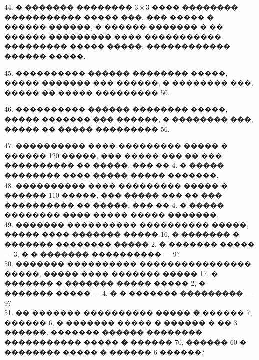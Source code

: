 \documentclass[12pt]{article}
\begin{document}
\begin{center}
\begin{figure}[ht!]
\end{figure}
\end{center}
44. � ������� �������� $3\times3$ ���� �������� ����������� ����� ���, ��� ����� � ������ ������, � ������ ������� � �� ������ ��������� ���� �����������. ��������� ����� �����. ������������ ������ �����.
\begin{center}
\begin{figure}[ht!]
\end{figure}
\end{center}
45. ���������� ������ �������� �����, ����� ������� ��� ������, � �������� ���, ����� �� ����� ��������� 50.
\begin{center}
\begin{figure}[ht!]
\end{figure}
\end{center}
46. ���������� ������ �������� �����, ����� ������� ��� ������, � �������� ���, ����� �� ����� ��������� 56.
\begin{center}
\begin{figure}[ht!]
\end{figure}
\end{center}
47. ���������� ���� ��������� ����� � ������ 120 �����, ��� ����� ��� �� ��� ���������� �� �����, ��� �� 4. � ����� �������� ���� ����� ����� �������.\\
48. ���������� ���� ��������� ����� � ������ 110 �����, ��� ����� ��� �� ��� ���������� �� �����, ��� �� 4. � ����� �������� ���� ����� ����� �������.\\
49. ������� ���������� ���������� �����, ����� ���� ������� ����� 16, � ������� � ������� �������� ����� 2, � ������� ����� --- 3, � � ������� ���������� --- 9?\\
50. ������� ���������� ���������������� �����, ����� ���� ������� ����� 17, � ������� � ������� ����� ����� 2, � ������� ����� --- 4, � � ������� ��������� --- 9?\\
51. �� ������� ���������� ����� {\bf �} ������ 7, ������ 6, � ������� ����� � ������ � �� 3 ������. ������� ������ �������� ����������� ����� {\bf �} ������ 70, ������ 60 � �������� ����� � ������ 6 ������?
\begin{center}
\begin{figure}[ht!]
\end{figure}
\end{center}
\end{document}
